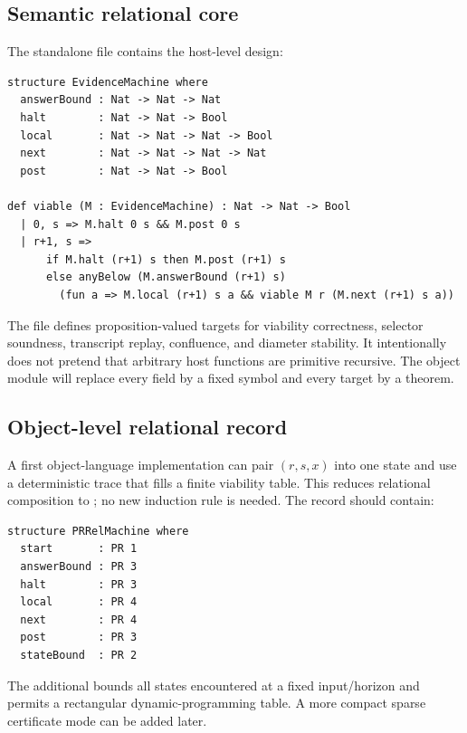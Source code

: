 \subsection{Semantic relational core}

The standalone file  contains the host-level design:

\begin{lstlisting}
structure EvidenceMachine where
  answerBound : Nat -> Nat -> Nat
  halt        : Nat -> Nat -> Bool
  local       : Nat -> Nat -> Nat -> Bool
  next        : Nat -> Nat -> Nat -> Nat
  post        : Nat -> Nat -> Bool

def viable (M : EvidenceMachine) : Nat -> Nat -> Bool
  | 0, s => M.halt 0 s && M.post 0 s
  | r+1, s =>
      if M.halt (r+1) s then M.post (r+1) s
      else anyBelow (M.answerBound (r+1) s)
        (fun a => M.local (r+1) s a && viable M r (M.next (r+1) s a))
\end{lstlisting}

The file defines proposition-valued targets for viability correctness, selector soundness, transcript replay, confluence, and diameter stability.  It intentionally does not pretend that arbitrary host functions are primitive recursive.  The object module will replace every field by a fixed  symbol and every target by a  theorem.

\subsection{Object-level relational record}

A first object-language implementation can pair $(r,s,x)$ into one state and use a deterministic trace that fills a finite viability table.  This reduces relational composition to ; no new induction rule is needed.  The record should contain:

\begin{lstlisting}
structure PRRelMachine where
  start       : PR 1
  answerBound : PR 3
  halt        : PR 3
  local       : PR 4
  next        : PR 4
  post        : PR 3
  stateBound  : PR 2
\end{lstlisting}

The additional  bounds all states encountered at a fixed input/horizon and permits a rectangular dynamic-programming table.  A more compact sparse certificate mode can be added later.

